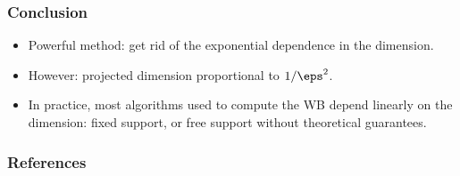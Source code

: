 \documentclass{beamer}
\begin{document}
\begin{frame}
\frametitle{Conclusion}
\begin{itemize}
    \item Powerful method: get rid of the exponential dependence in the dimension.
    \item However: projected dimension proportional to $1 / \eps^2$.
    \item In practice, most algorithms used to compute the WB depend linearly on the dimension: fixed support, or free support without theoretical guarantees.
\end{itemize}
\end{frame}

\begin{frame}
\frametitle{References}
\printbibliography
\end{frame}
\end{document}
